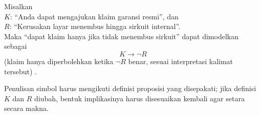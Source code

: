 Misalkan \\
$K$: ``Anda dapat mengajukan klaim garansi resmi'', dan \\
$R$: ``Kerusakan layar menembus hingga sirkuit internal''.\\
Maka ``dapat klaim hanya jika tidak menembus sirkuit'' dapat dimodelkan sebagai
\[
K \rightarrow \neg R
\]
(klaim hanya diperbolehkan ketika $\neg R$ benar, sesuai interpretasi kalimat tersebut) \cite{wiki_first_order_logic}.

Penulisan simbol harus mengikuti definisi proposisi yang disepakati; jika definisi $K$ dan $R$ diubah, bentuk implikasinya harus disesuaikan kembali agar setara secara makna.
